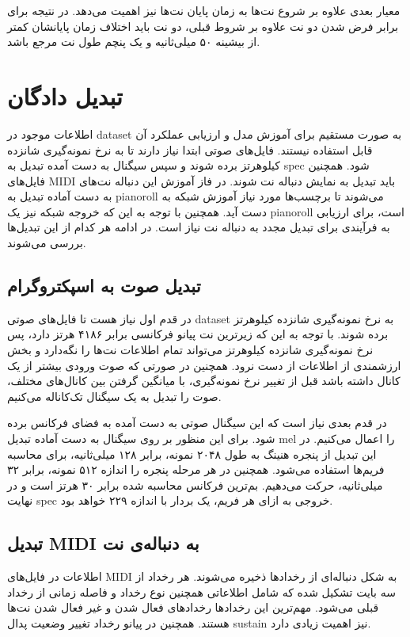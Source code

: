 معیار بعدی علاوه بر شروع نت‌ها به زمان پایان نت‌ها نیز اهمیت می‌دهد. در نتیجه
برای برابر فرض شدن دو نت علاوه بر شروط قبلی، دو نت باید اختلاف زمان پایانشان
کمتر از بیشینه ۵۰ میلی‌ثانیه و یک پنچم طول نت مرجع باشد.

\section{تبدیل دادگان}
اطلاعات موجود در \gls{dataset} به صورت مستقیم برای آموزش مدل و ارزیابی عملکرد آن
قابل استفاده نیستند. فایل‌های صوتی ابتدا نیاز دارند تا به نرخ نمونه‌گیری شانزده
کیلوهرتز برده شوند و سپس سیگنال به دست آمده تبدیل به \gls{spec} شود. همچنین
فایل‌های \gls{MIDI} باید تبدیل به نمایش دنباله نت شوند. در فاز آموزش این
دنباله نت‌های به دست آماده تبدیل به \gls{pianoroll} می‌شوند تا برچسب‌ها مورد
نیاز آموزش شبکه به دست آید. همچنین با توجه به این که خروجه شبکه نیز یک
\gls{pianoroll} است، برای ارزیابی به فرآیندی برای تبدیل مجدد به دنباله نت نیاز
است. در ادامه هر کدام از این تبدیل‌ها بررسی می‌شوند.

\subsection{تبدیل صوت به اسپکتروگرام}
در قدم اول نیاز هست تا فایل‌های صوتی \gls{dataset} به نرخ نمونه‌گیری شانزده
کیلوهرتز برده شوند. با توجه به این که زیرترین نت پیانو فرکانسی برابر ۴۱۸۶ هرتز
دارد، پس نرخ نمونه‌گیری شانزده کیلوهرتز می‌تواند تمام اطلاعات نت‌ها را نگه‌دارد
و بخش ارزشمندی از اطلاعات از دست نرود. همچنین در صورتی که صوت ورودی بیشتر از یک
کانال داشته باشد قبل از تغییر نرخ نمونه‌گیری، با میانگین گرفتن بین کانال‌های
مختلف، صوت را تبدیل به یک سیگنال تک‌کاناله می‌کنیم.

در قدم بعدی نیاز است که این سیگنال صوتی به دست آمده به فضای فرکانس برده شود.
برای این منظور بر روی سیگنال به دست آماده تبدیل mel را اعمال می‌کنیم. در این
تبدیل از پنجره هنینگ به طول ۲۰۴۸ نمونه، برابر ۱۲۸ میلی‌ثانیه، برای محاسبه
فریم‌ها استفاده می‌شود. همچنین در هر مرحله پنجره را اندازه ۵۱۲ نمونه، برابر ۳۲
میلی‌ثانیه، حرکت می‌دهیم. بم‌ترین فرکانس محاسبه شده برابر ۳۰ هرتز است و در نهایت
\gls{spec} خروجی به ازای هر فریم، یک بردار با اندازه ۲۲۹ خواهد بود.

\subsection{تبدیل MIDI به دنباله‌ی نت}
اطلاعات در فایل‌های \gls{MIDI} به شکل دنباله‌ای از رخدادها ذخیره می‌شوند. هر
رخداد از سه بایت تشکیل شده که شامل اطلاعاتی همچنین نوع رخداد و فاصله زمانی از
رخداد قبلی می‌شود. مهم‌ترین این رخدادها رخدادهای فعال شدن و غیر فعال شدن نت‌ها
هستند. همچنین در پیانو رخداد تغییر وضعیت پدال \gls{sustain} نیز اهمیت زیادی
دارد.

